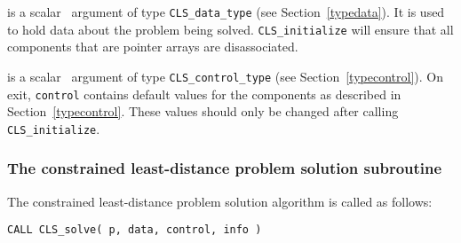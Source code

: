 \documentclass{galahad}
\newcommand{\packagename}{CLS}
\begin{document}
\vspace*{-3mm}
\begin{description}

 is a scalar \intentout\ argument of type
{\tt \packagename\_data\_type}
(see Section~\ref{typedata}). It is used to hold data about the problem being
solved. {\tt \packagename\_initialize} will ensure that all components
that are pointer arrays are disassociated.

 is a scalar \intentout\ argument of type
{\tt \packagename\_control\_type}
(see Section~\ref{typecontrol}).
On exit, {\tt control} contains default values for the components as
described in Section~\ref{typecontrol}.
These values should only be changed after calling
{\tt \packagename\_initialize}.

\end{description}


\subsubsection{The constrained least-distance problem solution subroutine}
The  constrained least-distance problem solution algorithm is called as follows:
\vspace*{1mm}

\hspace{8mm}
{\tt CALL \packagename\_solve( p, data, control, info )}
\end{document}
